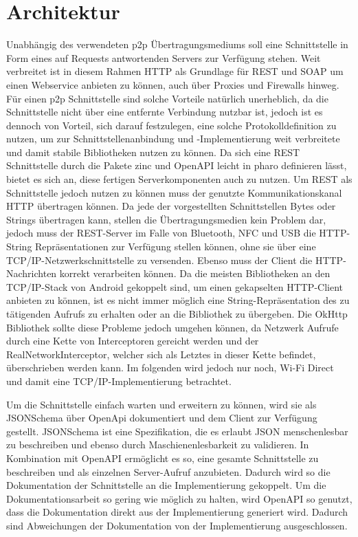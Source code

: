 \section{Architektur}

    Unabhängig des verwendeten p2p Übertragungsmediums soll eine Schnittstelle in Form eines auf Requests antwortenden Servers zur Verfügung stehen.
	Weit verbreitet ist in diesem Rahmen HTTP als Grundlage für REST und SOAP um einen Webservice anbieten zu können, auch über Proxies und Firewalls hinweg. Für einen p2p Schnittstelle sind solche Vorteile natürlich unerheblich, da die Schnittstelle nicht über eine entfernte Verbindung nutzbar ist, jedoch ist es dennoch von Vorteil, sich darauf festzulegen, eine solche Protokolldefinition zu nutzen, um zur Schnittstellenanbindung und -Implementierung weit verbreitete und damit stabile Bibliotheken nutzen zu können.
    Da sich eine REST Schnittstelle durch die Pakete zinc \cite{AI-pharoZinc} und OpenAPI \cite{AI-pharoOpenApi} leicht in pharo definieren lässt, bietet es sich an, diese fertigen Serverkomponenten auch zu nutzen.
    Um REST als Schnittstelle jedoch nutzen zu können muss der genutzte Kommunikationskanal HTTP übertragen können. Da jede der vorgestellten Schnittstellen Bytes oder Strings
    übertragen kann, stellen die Übertragungsmedien kein Problem dar, jedoch muss der REST-Server im Falle von Bluetooth, NFC und USB die HTTP-String Repräsentationen zur Verfügung stellen können,
    ohne sie über eine TCP/IP-Netzwerkschnittstelle zu versenden. Ebenso muss der Client die HTTP-Nachrichten korrekt verarbeiten können.
    Da die meisten Bibliotheken an den TCP/IP-Stack von Android gekoppelt sind, um einen gekapselten HTTP-Client anbieten zu können, ist es nicht immer möglich eine String-Repräsentation des zu tätigenden Aufrufs zu erhalten oder an die Bibliothek zu übergeben.
    Die OkHttp Bibliothek \cite{AI-AndroidOkHttp} sollte diese Probleme jedoch umgehen können, da Netzwerk Aufrufe durch eine Kette von Interceptoren gereicht werden und der RealNetworkInterceptor,
    welcher sich als Letztes in dieser Kette befindet, überschrieben werden kann.
	Im folgenden wird jedoch nur noch, Wi-Fi Direct und damit eine TCP/IP-Implementierung betrachtet.
	
    Um die Schnittstelle einfach warten und erweitern zu können, wird sie als JSONSchema über OpenApi dokumentiert und dem Client zur Verfügung gestellt.
    JSONSchema ist eine Spezifikation, die es erlaubt JSON menschenlesbar zu beschreiben und ebenso durch Maschienenlesbarkeit zu validieren.\cite{AI-JsonSchema} In Kombination mit OpenAPI ermöglicht es so, eine gesamte Schnittstelle zu beschreiben und als einzelnen Server-Aufruf anzubieten.\cite{AI-OpenApi} Dadurch wird so die Dokumentation der Schnittstelle an die Implementierung gekoppelt. Um die Dokumentationsarbeit so gering wie möglich zu halten, wird OpenAPI so genutzt, dass die Dokumentation direkt aus der Implementierung generiert wird. Dadurch sind Abweichungen der Dokumentation von der Implementierung ausgeschlossen.

